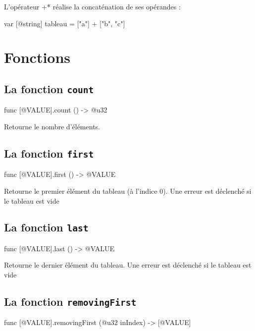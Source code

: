 L'opérateur \ggsq*+* réalise la concaténation de ses opérandes :

\begin{galgas4}
var [@string] tableau = ["a"] + ["b", "c"]
\end{galgas4}



\section{Fonctions}

\subsection{La fonction \texttt{count}}

\begin{galgas4box}
func [@VALUE].count () -> @u32
\end{galgas4box}

Retourne le nombre d'éléments.


\subsection{La fonction \texttt{first}}

\begin{galgas4box}
func [@VALUE].first () -> @VALUE
\end{galgas4box}

Retourne le premier élément du tableau (à l'indice $0$). Une erreur est déclenché si le tableau est vide



\subsection{La fonction \texttt{last}}

\begin{galgas4box}
func [@VALUE].last () -> @VALUE
\end{galgas4box}

Retourne le dernier élément du tableau. Une erreur est déclenché si le tableau est vide





\subsection{La fonction \texttt{removingFirst}}

\begin{galgas4box}
func [@VALUE].removingFirst (@u32 inIndex) -> [@VALUE]
\end{galgas4box}

